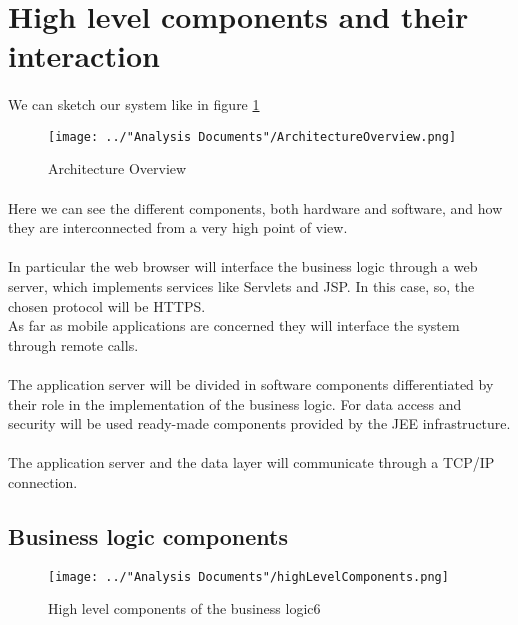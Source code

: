 \section{High level components and their interaction}
\paragraph{}We can sketch our system like in figure \ref{fig:architectureOverview}
\begin{figure}
	\centering
	\texttt{[image: ../"Analysis Documents"/ArchitectureOverview.png]}
	\label{fig:architectureOverview}
	\caption{Architecture Overview}
\end{figure}
\paragraph{}Here we can see the different components, both hardware and software, and how they are interconnected from a very high point of view.
\paragraph{} In particular the web browser will interface the business logic through a web server, which implements services like Servlets and JSP. In this case, so, the chosen protocol will be HTTPS.\\
As far as mobile applications are concerned they will interface the system through remote calls.
\paragraph{}The application server will be divided in software components differentiated by their role in the implementation of the business logic. For data access and security will be used ready-made components provided by the JEE infrastructure.
\paragraph{} The application server and the data layer will communicate through a TCP/IP connection.
\subsection{Business logic components}

\begin{figure}
	\centering
	\texttt{[image: ../"Analysis Documents"/highLevelComponents.png]}
	\label{fig:highLevelComponents}
	\caption{High level components of the business logic6}
\end{figure}
